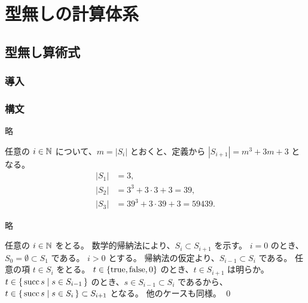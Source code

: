 \part{型無しの計算体系}
\chapter{型無し算術式}
\section{導入}

\section{構文}

\begin{jexercise*}[3.2.4]
  略
\end{jexercise*}
\begin{jproof}
  任意の $i \in \mathbb{N}$ について、$m = |S_i|$ とおくと、定義から $|S_{i+1}| = m^3 + 3m + 3$ となる。
  \begin{align*}
    |S_1| & = 3,
    \\ |S_2| & = 3^3 + 3 \cdot 3 + 3 = 39,
    \\ |S_3| & = 39^3 + 3 \cdot 39 + 3 = 59439.
  \end{align*}
\end{jproof}

\begin{jexercise*}[3.2.5.]
  略
\end{jexercise*}
\begin{jproof}
  任意の $i \in \mathbb{N}$ をとる。
  数学的帰納法により、$S_i \subset S_{i+1}$ を示す。
  $i = 0$ のとき、$S_0 = \emptyset \subset S_1$ である。
  $i > 0$ とする。
  帰納法の仮定より、$S_{i-1} \subset S_i$ である。
  任意の項 $t \in S_i$ をとる。
  $t \in \{\operatorname{true}, \operatorname{false}, 0\}$ のとき、$t \in S_{i+1}$ は明らか。
  $t \in \{\,\operatorname{succ} s \mid s \in S_{i-1}\,\}$ のとき、$s \in S_{i-1} \subset S_i$ であるから、$t \in \{\,\operatorname{succ} s \mid s \in S_i\,\} \subset S_{i+1}$ となる。
  他のケースも同様。
  \qed
\end{jproof}
